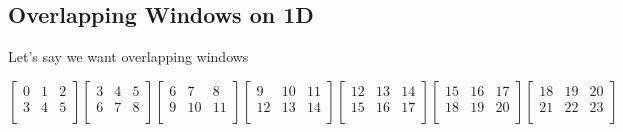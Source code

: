 \documentclass[oneside, 12pt]{report}
\begin{document}
\newpage

\subsection{Overlapping Windows on 1D}

Let's say we want overlapping windows

\begin{equation*}
\begin{bmatrix}
0 & 1 & 2 \\
3 & 4 & 5 \\
\end{bmatrix}
\begin{bmatrix}
3 & 4 & 5 \\
6 & 7 & 8 \\
\end{bmatrix}
\begin{bmatrix}
6 & 7 & 8 \\
9 & 10 & 11 \\
\end{bmatrix}
\begin{bmatrix}
9 & 10 & 11 \\
12 & 13 & 14 \\
\end{bmatrix}
\begin{bmatrix}
12 & 13 & 14 \\
15 & 16 & 17 \\
\end{bmatrix}
\begin{bmatrix}
15 & 16 & 17 \\
18 & 19 & 20 \\
\end{bmatrix}
\begin{bmatrix}
18 & 19 & 20 \\
21 & 22 & 23 \\
\end{bmatrix}
\end{equation*}
\end{document}
